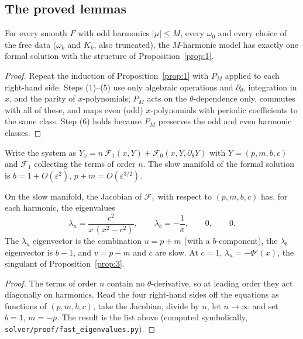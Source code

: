\documentclass{amsart}
\numberwithin{equation}{section}
\theoremstyle{plain}
\newenvironment{lemnamed}[1]{\renewcommand\theinnerlem{#1}\innerlem}{\endinnerlem}
\theoremstyle{definition}
\theoremstyle{remark}
\newcommand{\eps}{\varepsilon}
\newcommand{\repo}[1]{\texttt{#1}}
\begin{document}
\subsection{The proved lemmas}

\begin{lemnamed}{B1($M$)}\label{lem:B1}
For every smooth $F$ with odd harmonics $|\mu| \le M$, every $\omega_0$ and every choice of the free data ($\omega_k$ and
$K_k$, also truncated), the $M$-harmonic model has exactly one formal solution with the structure of
Proposition~\ref{prop:1}.
\end{lemnamed}

\begin{proof}
Repeat the induction of Proposition~\ref{prop:1} with $P_M$ applied to each right-hand side. Steps (1)--(5) use only
algebraic operations and $\partial_\theta$, integration in $x$, and the parity of $x$-polynomials; $P_M$ acts on the
$\theta$-dependence only, commutes with all of these, and maps even (odd) $x$-polynomials with periodic coefficients to
the same class. Step (6) holds because $P_M$ preserves the odd and even harmonic classes.
\end{proof}

Write the system as $Y_x = n\,\mathcal F_1(x, Y) + \mathcal F_0(x, Y, \partial_\theta Y)$ with $Y = (p, m, b, c)$ and
$\mathcal F_1$ collecting the terms of order $n$. The slow manifold of the formal solution is $b = 1 + O(\eps^2)$,
$p + m = O(\eps^{3/2})$.

\begin{lemnamed}{B2($M$)}\label{lem:B2}
On the slow manifold, the Jacobian of $\mathcal F_1$ with respect to $(p, m, b, c)$ has, for each harmonic, the eigenvalues
\[
\lambda_u = \frac{c^2}{x\,(x^2-c^2)}, \qquad \lambda_b = -\frac1x, \qquad 0, \qquad 0 .
\]
The $\lambda_u$ eigenvector is the combination $u = p + m$ (with a $b$-component), the $\lambda_b$ eigenvector is $b - 1$,
and $v = p - m$ and $c$ are slow. At $c = 1$, $\lambda_u = -\Phi'(x)$, the singulant of Proposition~\ref{prop:3}.
\end{lemnamed}

\begin{proof}
The terms of order $n$ contain no $\theta$-derivative, so at leading order they act diagonally on harmonics. Read the
four right-hand sides off the equations as functions of $(p, m, b, c)$, take the Jacobian, divide by $n$, let
$n \to \infty$ and set $b = 1$, $m = -p$. The result is the list above (computed symbolically,
\repo{solver/proof/fast\_eigenvalues.py}).
\end{proof}
\end{document}
